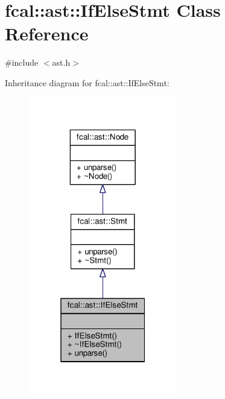 \hypertarget{classfcal_1_1ast_1_1IfElseStmt}{}\section{fcal\+:\+:ast\+:\+:If\+Else\+Stmt Class Reference}
\label{classfcal_1_1ast_1_1IfElseStmt}


{\ttfamily \#include $<$ast.\+h$>$}



Inheritance diagram for fcal\+:\+:ast\+:\+:If\+Else\+Stmt\+:
\nopagebreak
\begin{figure}[H]
\begin{center}
\leavevmode
\includegraphics[width=184pt]{classfcal_1_1ast_1_1IfElseStmt__inherit__graph}
\end{center}
\end{figure}


